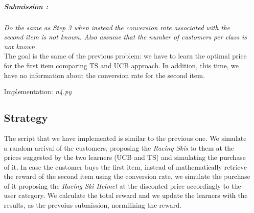 \subparagraph*{Submission : }
\textit{Do the same as Step 3 when instead the conversion rate associated with the second item is not known. Also assume that the number of customers per class is not known.}\\

The goal is the same of the previous problem: we have to learn the optimal price for the first item comparing TS and UCB approach. In addition, this time, we have no information about the conversion rate for the second item. 

Implementation: \textit{n4.py}
\subsection*{Strategy}
The script that we have implemented is similar to the previous one. We simulate a random arrival of the customers, proposing the \textit{Racing Skis} to them at the prices suggested by the two learners (UCB and TS) and simulating the purchase of it. In case the customer buys the first item, instead of mathematically retrieve the reward of the second item using the conversion rate, we simulate the purchase of it proposing the \textit{Racing Ski Helmet} at the disconted price accordingly to the user category. We calculate the total reward and we update the learners with the results, as the prevoius submission, normilizing the reward. 

